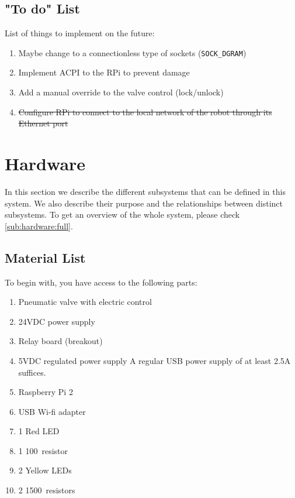 \documentclass[twoside,a4paper]{refart}
\begin{document}
\subsection{"To do" List}
List of things to implement on the future:
\begin{enumerate}
	\item
	 Maybe change to a connectionless type of sockets ({\tt SOCK\_DGRAM})
	\item
	 Implement ACPI to the RPi to prevent damage
	\item
	 Add a manual override to the valve control (lock/unlock)
	\item
	 \st{Configure RPi to connect to the local network of the robot through its Ethernet port}
\end{enumerate}

\section{Hardware}
In this section we describe the different subsystems that can be defined in this system. We also describe their purpose and the relationships between distinct subsystems. To get an overview of the whole system, please check \cref{sub:hardware:full}.

\subsection{Material List}

To begin with, you have access to the following parts:
\begin{enumerate}
	
\item
Pneumatic valve with electric control
\item
24VDC power supply
\item
Relay board (breakout)
\item
5VDC regulated power supply
A regular USB power supply of at least 2.5A suffices. 
\item
Raspberry Pi 2
\item
USB Wi-fi adapter
\item
1 Red LED
\item
1 100\Omega \ resistor
\item
2 Yellow LEDs
\item
2 1500\Omega \ resistors
	
\end{enumerate}
\end{document}
